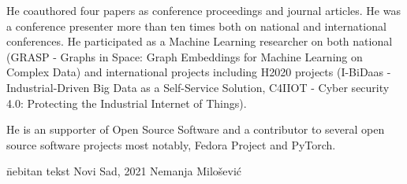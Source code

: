 \documentclass[b5paper]{book}
\begin{document}
He coauthored four papers as conference proceedings and
journal articles. He was a conference presenter more than ten times both on national and international conferences. He participated as a Machine Learning researcher on both national (GRASP - Graphs in Space: Graph Embeddings for Machine Learning on Complex Data) and international projects including H2020 projects (I-BiDaas - Industrial-Driven Big Data as a Self-Service Solution, C4IIOT - Cyber security 4.0: Protecting the Industrial Internet of Things).

He is an supporter of Open Source Software and a contributor to several open source software projects most notably, Fedora Project and PyTorch.

\vfill


\begin{tabbing}
  \hspace{0.7\textwidth} \= nebitan tekst \kill
  Novi Sad, 2021 \> Nemanja Milošević
\end{tabbing}
\end{document}
